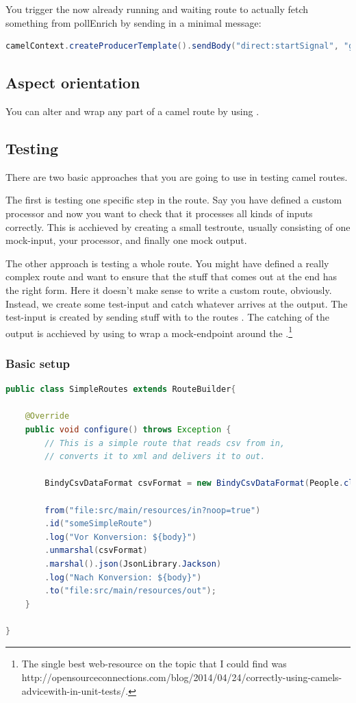 You trigger the now already running and waiting route to actually fetch something from pollEnrich by sending in a minimal message: 

\begin{lstlisting}[language=java]
camelContext.createProducerTemplate().sendBody("direct:startSignal", "go and fetch something from file!");
\end{lstlisting}

\subsection{Aspect orientation}
You can alter and wrap any part of a camel route by using .

\subsection{Testing}

There are two basic approaches that you are going to use in testing camel routes. 

The first is testing one specific step in the route. Say you have defined a custom processor and now you want to check that it processes all kinds of inputs correctly. This is acchieved by creating a small testroute, usually consisting of one mock-input, your processor, and finally one mock output. 

The other approach is testing a whole route. You might have defined a really complex route and want to ensure that the stuff that comes out at the end has the right form. Here it doesn't make sense to write a custom route, obviously. Instead, we create some test-input and catch whatever arrives at the output. The test-input is created by sending stuff with  to the routes . The catching of the output is acchieved by using  to wrap a mock-endpoint around the .\footnote{The single best web-resource on the topic that I could find was http://opensourceconnections.com/blog/2014/04/24/correctly-using-camels-advicewith-in-unit-tests/.}

\subsubsection{Basic setup}

\begin{lstlisting}[language=java]
public class SimpleRoutes extends RouteBuilder{

	@Override
	public void configure() throws Exception {
		// This is a simple route that reads csv from in, 
		// converts it to xml and delivers it to out. 
		
		BindyCsvDataFormat csvFormat = new BindyCsvDataFormat(People.class);
		
		from("file:src/main/resources/in?noop=true")
		.id("someSimpleRoute")
		.log("Vor Konversion: ${body}")
		.unmarshal(csvFormat)
		.marshal().json(JsonLibrary.Jackson)
		.log("Nach Konversion: ${body}")
		.to("file:src/main/resources/out");
	}

}
\end{lstlisting}


